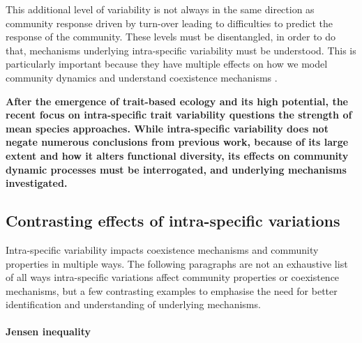 This additional level of variability is not always in the same direction as community response driven by turn-over \parencite{albert_intraspecific_2010, kichenin_contrasting_2013, jung_intraspecific_2014} leading to difficulties to predict the response of the community. These levels must be disentangled, in order to do that, mechanisms underlying intra-specific variability must be understood. This is particularly important because they have multiple effects on how we model community dynamics and understand coexistence mechanisms \cite{bolnick_why_2011, violle_return_2012}.
%
%
%
%

\textbf{After the emergence of trait-based ecology and its high potential, the recent focus on intra-specific trait variability questions the strength of mean species approaches. While  intra-specific variability  does not negate numerous conclusions from previous work, because of its large extent and how it alters functional diversity, its effects on community dynamic processes must be interrogated, and underlying mechanisms investigated.}

\subsection{Contrasting effects of intra-specific variations}

Intra-specific variability impacts coexistence mechanisms and community properties in multiple ways. The following paragraphs are not an exhaustive list of all ways intra-specific variations affect community properties or coexistence mechanisms, but a few contrasting examples to emphasise the need for better identification and understanding of underlying mechanisms. 

\paragraph{Jensen inequality}

